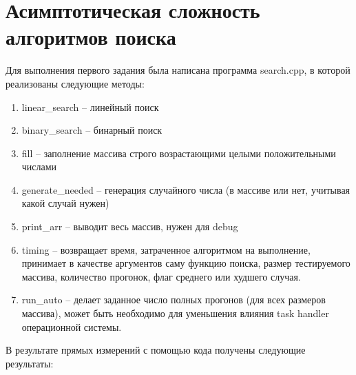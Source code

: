 \documentclass[a4paper,12pt]{report}
\begin{document}
	\newpage
    
    \section*{Асимптотическая сложность алгоритмов поиска}
    Для выполнения первого задания была написана программа search.cpp, в которой реализованы следующие методы:
    \begin{enumerate}
        \item linear\_search -- линейный поиск
        \item binary\_search -- бинарный поиск
        \item fill -- заполнение массива строго возрастающими целыми положительными числами
        \item generate\_needed -- генерация случайного числа (в массиве или нет, учитывая какой случай нужен)
        \item print\_arr -- выводит весь массив, нужен для debug
        \item timing -- возвращает время, затраченное алгоритмом на выполнение, принимает в качестве аргументов саму функцию поиска, размер тестируемого массива, количество прогонок, флаг среднего или худшего случая.
        \item run\_auto -- делает заданное число полных прогонов (для всех размеров массива), может быть необходимо для уменьшения влияния task handler операционной системы. 
    \end{enumerate}
    В результате прямых измерений с помощью кода получены следующие результаты:
\end{document}

